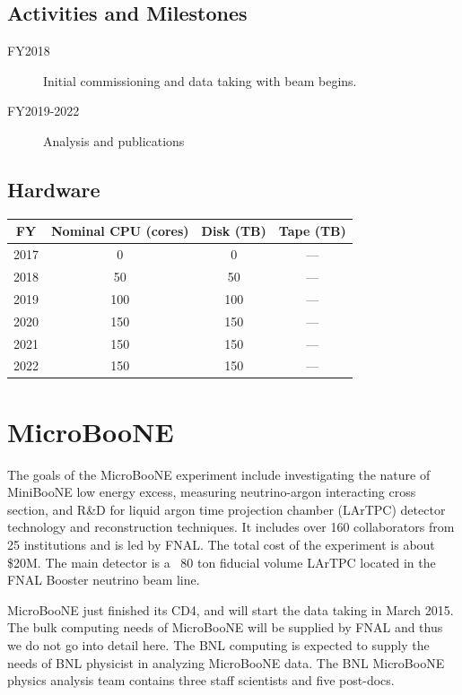 \documentclass[pdftex,12pt,letter]{article}
\begin{document}
\subsection{Activities and Milestones}

\begin{description}
\item[FY2018] Initial commissioning and data taking with beam begins.
\item[FY2019-2022] Analysis and publications
\end{description}

\subsection{Hardware}

\begin{table}[tbh]
\centering
\begin{tabular}{|c|c|c|c|}
\hline
FY & Nominal CPU (cores) & Disk (TB) & Tape (TB) \\
\hline
2017 &  0 & 0  & ---  \\
\hline
2018 &  50 & 50  & --- \\
\hline
2019  & 100 & 100 & ---  \\
\hline
2020 &  150  & 150 & --- \\
\hline
2021 &  150  & 150 & --- \\
\hline
2022 &  150  & 150 & --- \\
\hline
\end{tabular}
\end{table}

\pagebreak
\section{MicroBooNE}

The goals of the MicroBooNE experiment include investigating the nature of 
MiniBooNE low energy excess, measuring neutrino-argon interacting cross section,
and R\&D for liquid argon time projection chamber (LArTPC) detector technology 
and reconstruction techniques. It includes over 160 collaborators from 
25 institutions and is led by FNAL. The total cost of the experiment is about 
\$20M. The main detector is a ~80 ton fiducial volume LArTPC located in the 
FNAL Booster neutrino beam line. 

MicroBooNE just finished its CD4, and will start the data taking in March 2015. 
The bulk computing needs of MicroBooNE will be supplied by FNAL and 
thus we do not go into detail here. The BNL computing is expected to supply
the needs of BNL physicist in analyzing MicroBooNE data. The BNL MicroBooNE
physics analysis team contains three staff scientists and five post-docs. 
\end{document}
